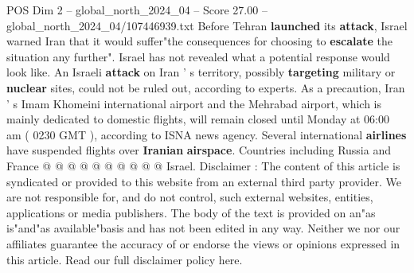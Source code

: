 \begin{textsample}{POS Dim 2 – global\_north\_2024\_04 – Score 27.00 – global\_north\_2024\_04/107446939.txt}
Before Tehran \textbf{launched} its \textbf{attack}, Israel warned Iran that it would suffer"the consequences for choosing to \textbf{escalate} the situation any further".
Israel has not revealed what a potential response would look like.
An Israeli \textbf{attack} on Iran ' s territory, possibly \textbf{targeting} military or \textbf{nuclear} sites, could not be ruled out, according to experts.
As a precaution, Iran ' s Imam Khomeini international airport and the Mehrabad airport, which is mainly dedicated to domestic flights, will remain closed until Monday at 06:00 am ( 0230 GMT ), according to ISNA news agency.
Several international \textbf{airlines} have suspended flights over \textbf{Iranian} \textbf{airspace}.
Countries including Russia and France @ @ @ @ @ @ @ @ @ @ Israel.
Disclaimer : The content of this article is syndicated or provided to this website from an external third party provider.
We are not responsible for, and do not control, such external websites, entities, applications or media publishers.
The body of the text is provided on an"as is"and"as available"basis and has not been edited in any way.
Neither we nor our affiliates guarantee the accuracy of or endorse the views or opinions expressed in this article.
Read our full disclaimer policy here.

\end{textsample}

